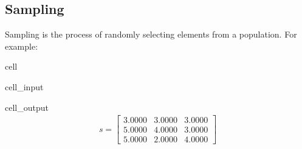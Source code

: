 \documentclass[letterpaper,10pt,english]{jupyterBook}
\begin{document}
\subsection{Sampling}
\label{\detokenize{01:sampling}}
\sphinxAtStartPar
Sampling is the process of randomly selecting elements from a population. For example:

\begin{sphinxuseclass}{cell}\begin{sphinxVerbatimInput}

\begin{sphinxuseclass}{cell_input}
\begin{sphinxVerbatim}[commandchars=\\\{\}]
  \PYG{p}{[}    \PYG{p}{]}
     
 
\end{sphinxVerbatim}

\end{sphinxuseclass}\end{sphinxVerbatimInput}
\begin{sphinxVerbatimOutput}

\begin{sphinxuseclass}{cell_output}\begin{equation*}
\begin{split}\displaystyle s=\left[
\begin{array}{}
  3.0000 &  3.0000 &  3.0000\\
  5.0000 &  4.0000 &  3.0000\\
  5.0000 &  2.0000 &  4.0000
\end{array}
\right]\end{split}
\end{equation*}
\end{sphinxuseclass}\end{sphinxVerbatimOutput}

\end{sphinxuseclass}
\end{document}
